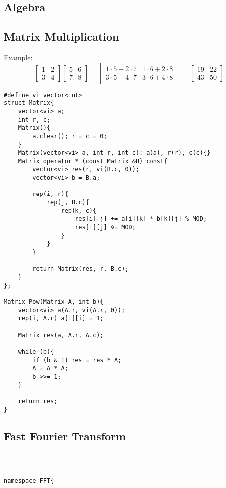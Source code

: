 \documentclass[11pt,a4paper]{article}
\begin{document}
\begin{multicols*}{2}
\section{Algebra}
\subsection{Matrix Multiplication}

Example:
\[
\begin{bmatrix}
1 & 2 \\
3 & 4
\end{bmatrix}
\begin{bmatrix}
5 & 6 \\
7 & 8
\end{bmatrix}
=
\begin{bmatrix}
1\cdot 5 + 2\cdot 7 & 1\cdot 6 + 2\cdot 8 \\
3\cdot 5 + 4\cdot 7 & 3\cdot 6 + 4\cdot 8
\end{bmatrix}
=
\begin{bmatrix}
19 & 22 \\
43 & 50
\end{bmatrix}
\]

\begin{lstlisting}
#define vi vector<int>
struct Matrix{
	vector<vi> a;
	int r, c;
	Matrix(){
		a.clear(); r = c = 0;
	}
	Matrix(vector<vi> a, int r, int c): a(a), r(r), c(c){}
	Matrix operator * (const Matrix &B) const{
		vector<vi> res(r, vi(B.c, 0));
		vector<vi> b = B.a;
		
		rep(i, r){
			rep(j, B.c){
				rep(k, c){
					res[i][j] += a[i][k] * b[k][j] % MOD;
					res[i][j] %= MOD; 
				}
			}
		}
		
		return Matrix(res, r, B.c);
	}
};

Matrix Pow(Matrix A, int b){
	vector<vi> a(A.r, vi(A.r, 0));
	rep(i, A.r) a[i][i] = 1;
	
	Matrix res(a, A.r, A.c);
	
	while (b){
		if (b & 1) res = res * A;
		A = A * A;
		b >>= 1;
	}
	
	return res;
}
\end{lstlisting}

\subsection{Fast Fourier Transform}
\begin{lstlisting}



namespace FFT{
    

\end{lstlisting}
\end{multicols*}
\end{document}
